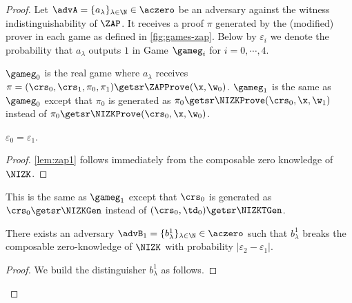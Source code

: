 \begin{proof}





Let $\advA=\{a_\lambda\}_{\lambda\in\N}\in\aczero$ be an adversary against the witness indistinguishability of $\ZAP$. It receives a proof $\pi$ generated by the (modified) prover in each game as defined in \cref{fig:games-zap}. Below by $\varepsilon_i$ we denote the probability that $a_\lambda$ outputs $1$ in Game $\gameg_i$ for $i=0,\cdots,4$.


$\gameg_0$ is the real game where $a_\lambda$ receives 
$\pi=(\crs_0,\crs_1,\pi_0,\allowbreak\pi_1)\getsr\ZAPProve( \x,\w_0)$.
$\gameg_1$ is the same as $\gameg_0$ except that $\pi_0$ is generated as 
$\pi_0\getsr\NIZKProve(\crs_0,\x,\w_1)$ {instead of}
$\pi_0\getsr\NIZKProve(\crs_0,\x,\w_0)$.
\begin{lemma}
\label{lem:zap1}
$\varepsilon_0=\varepsilon_1$.
\end{lemma}
\begin{proof}
\cref{lem:zap1} follows immediately from the composable zero knowledge of $\NIZK$.
\end{proof}

This is the same as $\gameg_1$ except that $\crs_0$ is generated  as $\crs_0\getsr\NIZKGen$ instead of $(\crs_0,\td_0)\getsr\NIZKTGen$.
\begin{lemma}
\label{lem:zap2}
There exists an adversary $\advB_1=\{b_\lambda^1\}_{\lambda\in\N}\in\aczero$ such that $b_\lambda^1$ breaks the composable zero-knowledge of $\NIZK$ with probability
$|\varepsilon_2-\varepsilon_1|$.
\end{lemma}
\begin{proof}
We build the distinguisher $b_\lambda^1$ as follows.


\end{proof}
\end{proof}
